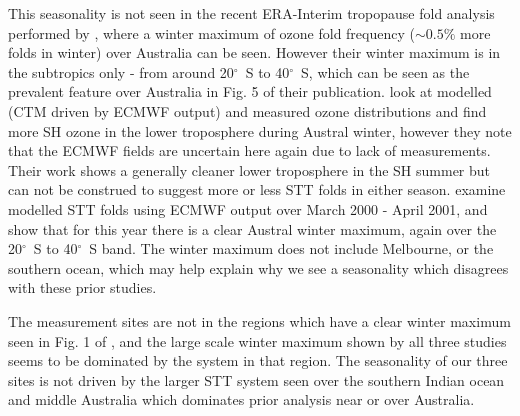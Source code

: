 \documentclass[acp, manuscript]{copernicus} %
\begin{document}
  This seasonality is not seen in the recent ERA-Interim tropopause fold analysis performed by \citet{Skerlak2015}, where a winter maximum of ozone fold frequency ($\sim 0.5\%$ more folds in winter) over Australia can be seen.
  However their winter maximum is in the subtropics only - from around 20$^{\circ}$~S to 40$^{\circ}$~S, which can be seen as the prevalent feature over Australia in Fig. 5 of their publication.
  \cite{Wauben1998} look at modelled (CTM driven by ECMWF output) and measured ozone distributions and find more SH ozone in the lower troposphere during Austral winter, however they note that the ECMWF fields are uncertain here again due to lack of measurements.
  Their work shows a generally cleaner lower troposphere in the SH summer but can not be construed to suggest more or less STT folds in either season.
  \cite{Sprenger2003} examine modelled STT folds using ECMWF output over March 2000 - April 2001, and show that for this year there is a clear Austral winter maximum, again over the 20$^{\circ}$~S to 40$^{\circ}$~S band.
  The winter maximum does not include Melbourne, or the southern ocean, which may help explain why we see a seasonality which disagrees with these prior studies.
  
  The measurement sites are not in the regions which have a clear winter maximum seen in Fig. 1 of \cite{Sprenger2003}, and the large scale winter maximum shown by all three studies seems to be dominated by the system in that region.
  The seasonality of our three sites is not driven by the larger STT system seen over the southern Indian ocean and middle Australia which dominates prior analysis near or over Australia.
  
\end{document}
